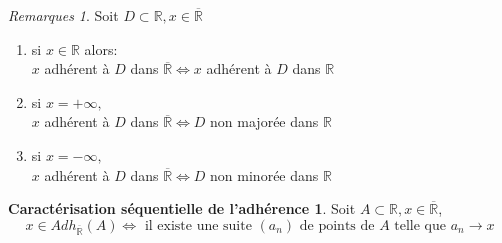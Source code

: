 \documentclass[fleqn]{article}
\theoremstyle{definition} \newtheorem*{defi}{D\'efinition}
\theoremstyle{definition} \newtheorem*{theo}{Th\'eor\`eme}
\theoremstyle{definition} \newtheorem*{adh}{Caract\'erisation s\'equentielle de l'adh\'erence}
\theoremstyle{remark} \newtheorem*{rqs}{Remarques}
\begin{document}
\begin{rqs}
	Soit $D \subset \mathbb{R}, x \in \overline{\mathbb{R}}$
	\begin{enumerate}
		\item si $x \in \mathbb{R}$ alors: \\
			$x$ adh\'erent \`a $D$ dans $\overline{\mathbb{R}} \Leftrightarrow x$ adh\'erent \`a $D$ dans $\mathbb{R}$
		\item si $x = +\infty,$ \\
			$x$ adh\'erent \`a $D$ dans $\overline{\mathbb{R}} \Leftrightarrow D$ non major\'ee dans $\mathbb{R}$
		\item si $x = -\infty,$ \\
			$x$ adh\'erent \`a $D$ dans $\overline{\mathbb{R}} \Leftrightarrow D$ non minor\'ee dans $\mathbb{R}$
	\end{enumerate}
\end{rqs}
\begin{adh}
	Soit $A \subset \mathbb{R}, x \in \overline{\mathbb{R}}$,
	\[x \in Adh_{\overline{\mathbb{R}}}(A) \Leftrightarrow \text{ il existe une suite } (a_n) \text{ de points de } A \text{ telle que }
	a_n \rightarrow x\]
\end{adh}
\end{document}
